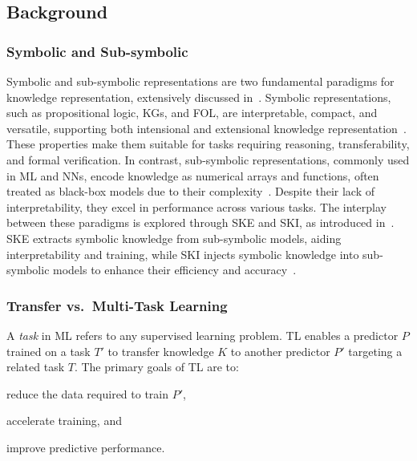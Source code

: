 \subsection{Background}
\label{subsec:background}

\subsubsection{Symbolic and Sub-symbolic}
\label{subsubsec:symbolic-and-sub-symbolic}
%
Symbolic and sub-symbolic representations are two fundamental paradigms for knowledge representation, extensively discussed in~.
%
Symbolic representations, such as propositional logic, \glspl{KG}, and \gls{FOL}, are interpretable, compact, and versatile, supporting both intensional and extensional knowledge representation~\cite{DBLP:conf/ogai/Gelder90,DBLP:conf/aiia/CiattoCOC19}.
%
These properties make them suitable for tasks requiring reasoning, transferability, and formal verification.
%
In contrast, sub-symbolic representations, commonly used in \gls{ML} and \glspl{NN}, encode knowledge as numerical arrays and functions, often treated as black-box models due to their complexity~\cite{interpretability-lipton-2018}.
%
Despite their lack of interpretability, they excel in performance across various tasks.
%
The interplay between these paradigms is explored through \gls{SKE} and \gls{SKI}, as introduced in~.
%
\gls{SKE} extracts symbolic knowledge from sub-symbolic models, aiding interpretability and training, while \gls{SKI} injects symbolic knowledge into sub-symbolic models to enhance their efficiency and accuracy~\cite{survey-ske-andrews-1995,survey-ski-besold-2017}.
%

\subsubsection{Transfer vs.\ Multi-Task Learning}
\label{subsubsec:tl-mtl}
%
A \emph{task} in \gls{ML} refers to any supervised learning problem.
%
\Gls{TL} enables a predictor \(P\) trained on a task \(T'\) to transfer knowledge \(K\) to another predictor \(P'\) targeting a related task \(T\).
%
The primary goals of \gls{TL} are to:
%
\begin{inlinelist}
    \item reduce the data required to train \(P'\),
    \item accelerate training, and
    \item improve predictive performance.
\end{inlinelist}

